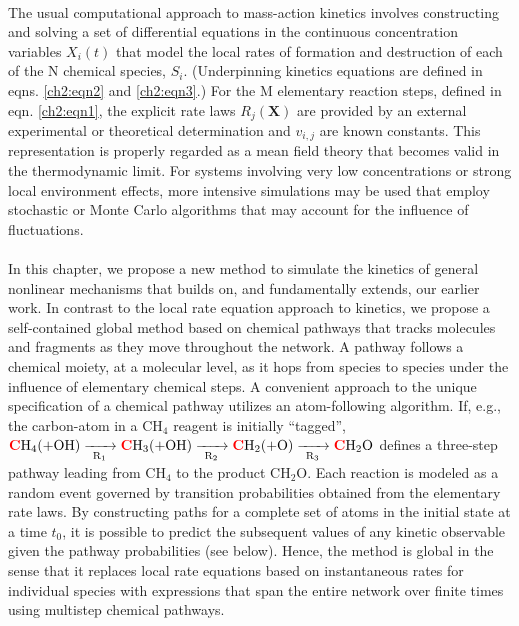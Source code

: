 \paragraph{}
The usual computational approach to mass-action kinetics involves constructing and solving a set of differential equations in the continuous concentration variables $X_i(t)$ that model the local rates of formation and destruction of each of the N chemical species, $S_i$. (Underpinning kinetics equations are defined in eqns. \ref{ch2:eqn2} and \ref{ch2:eqn3}.) For the M elementary reaction steps, defined in eqn. \ref{ch2:eqn1}, the explicit rate laws $R_j(\mathbf{X})$ are provided by an external experimental or theoretical determination and $v_{i,j}$ are known constants.\cite{ch1_IRPC_1_laidler1987chemical,ch1_IRPC_3_steinfeld1989chemical,ch1_IRPC_2_pilling1996reaction} This representation is properly regarded as a mean field theory that becomes valid in the thermodynamic limit.   For systems involving very low concentrations or strong local environment effects, more intensive simulations may be used that employ stochastic or Monte Carlo algorithms that may account for the influence of fluctuations.\cite{ch1_IRPC_34_mcquarrie1967stochastic,ch1_IRPC_35_gillespie1976general,ch4_6_kampen2007langevin}
\newline
\paragraph{}
In this chapter, we propose a new method to simulate the kinetics of general nonlinear mechanisms that builds on, and fundamentally extends, our earlier work.\cite{ch1_IRPC_15_kramer2014following,ch1_IRPC_16_ch3_6_ch4_8_bai2014sum,ch1_IRPC_17_ch4_9_bai2015sum,ch4_10_bai2016sum} In contrast to the local rate equation approach to kinetics, we propose a self-contained global method based on chemical pathways that tracks molecules and fragments as they move throughout the network.  A pathway follows a chemical moiety, at a molecular level, as it hops from species to species under the influence of elementary chemical steps. A convenient approach to the unique specification of a chemical pathway utilizes an atom-following algorithm.  If, e.g., the carbon-atom in a CH$_4$ reagent is initially “tagged”,  $\textcolor{red}{\textbf{C}}\text{H}_4(+\text{OH}) \xrightarrow[\text{R}_{1}]{\makebox[0.6cm]{}} \textcolor{red}{\textbf{C}}\text{H}_3 (+\text{OH})  \xrightarrow[\text{R}_{2}]{\makebox[0.6cm]{}} \textcolor{red}{\textbf{C}}\text{H}_2 (+\text{O}) \xrightarrow[\text{R}_{3}]{\makebox[0.6cm]{}} \textcolor{red}{\textbf{C}}\text{H}_2\text{O}$ defines a three-step pathway leading from CH$_4$ to the product CH$_2$O.  Each reaction is modeled as a random event governed by transition probabilities obtained from the elementary rate laws.  By constructing paths for a complete set of atoms in the initial state at a time $t_0$, it is possible to predict the subsequent values of any kinetic observable given the pathway probabilities (see below).  Hence, the method is global in the sense that it replaces local rate equations based on instantaneous rates for individual species with expressions that span the entire network over finite times using multistep chemical pathways.
\newline
